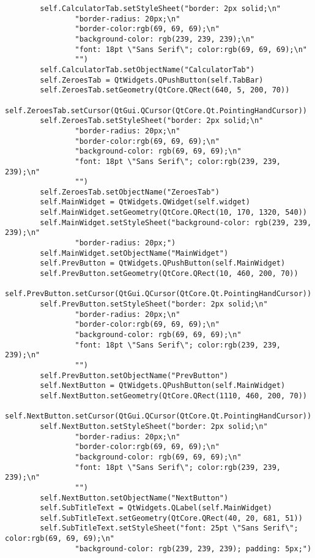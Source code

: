 \documentclass{article}
\begin{document}
\begin{lstlisting}
        self.CalculatorTab.setStyleSheet("border: 2px solid;\n"
                "border-radius: 20px;\n"
                "border-color:rgb(69, 69, 69);\n"
                "background-color: rgb(239, 239, 239);\n"
                "font: 18pt \"Sans Serif\"; color:rgb(69, 69, 69);\n"
                "")
        self.CalculatorTab.setObjectName("CalculatorTab")
        self.ZeroesTab = QtWidgets.QPushButton(self.TabBar)
        self.ZeroesTab.setGeometry(QtCore.QRect(640, 5, 200, 70))
        self.ZeroesTab.setCursor(QtGui.QCursor(QtCore.Qt.PointingHandCursor))
        self.ZeroesTab.setStyleSheet("border: 2px solid;\n"
                "border-radius: 20px;\n"
                "border-color:rgb(69, 69, 69);\n"
                "background-color: rgb(69, 69, 69);\n"
                "font: 18pt \"Sans Serif\"; color:rgb(239, 239, 239);\n"
                "")
        self.ZeroesTab.setObjectName("ZeroesTab")
        self.MainWidget = QtWidgets.QWidget(self.widget)
        self.MainWidget.setGeometry(QtCore.QRect(10, 170, 1320, 540))
        self.MainWidget.setStyleSheet("background-color: rgb(239, 239, 239);\n"
                "border-radius: 20px;")
        self.MainWidget.setObjectName("MainWidget")
        self.PrevButton = QtWidgets.QPushButton(self.MainWidget)
        self.PrevButton.setGeometry(QtCore.QRect(10, 460, 200, 70))
        self.PrevButton.setCursor(QtGui.QCursor(QtCore.Qt.PointingHandCursor))
        self.PrevButton.setStyleSheet("border: 2px solid;\n"
                "border-radius: 20px;\n"
                "border-color:rgb(69, 69, 69);\n"
                "background-color: rgb(69, 69, 69);\n"
                "font: 18pt \"Sans Serif\"; color:rgb(239, 239, 239);\n"
                "")
        self.PrevButton.setObjectName("PrevButton")
        self.NextButton = QtWidgets.QPushButton(self.MainWidget)
        self.NextButton.setGeometry(QtCore.QRect(1110, 460, 200, 70))
        self.NextButton.setCursor(QtGui.QCursor(QtCore.Qt.PointingHandCursor))
        self.NextButton.setStyleSheet("border: 2px solid;\n"
                "border-radius: 20px;\n"
                "border-color:rgb(69, 69, 69);\n"
                "background-color: rgb(69, 69, 69);\n"
                "font: 18pt \"Sans Serif\"; color:rgb(239, 239, 239);\n"
                "")
        self.NextButton.setObjectName("NextButton")
        self.SubTitleText = QtWidgets.QLabel(self.MainWidget)
        self.SubTitleText.setGeometry(QtCore.QRect(40, 20, 681, 51))
        self.SubTitleText.setStyleSheet("font: 25pt \"Sans Serif\"; color:rgb(69, 69, 69);\n"
                "background-color: rgb(239, 239, 239); padding: 5px;")

\end{lstlisting}
\end{document}
